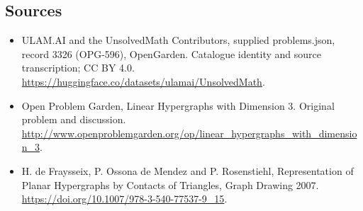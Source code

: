 \documentclass[11pt,a4paper]{article}
\begin{document}
\subsection{Sources}
\begin{itemize}
\item[S1] ULAM.AI and the UnsolvedMath Contributors, supplied problems.json, record 3326 (OPG-596), OpenGarden. Catalogue identity and source transcription; CC BY 4.0.
\url{https://huggingface.co/datasets/ulamai/UnsolvedMath}.
\item[S2] Open Problem Garden, Linear Hypergraphs with Dimension 3. Original problem and discussion.
\url{http://www.openproblemgarden.org/op/linear_hypergraphs_with_dimension_3}.
\item[S3] H. de Fraysseix, P. Ossona de Mendez and P. Rosenstiehl, Representation of Planar Hypergraphs by Contacts of Triangles, Graph Drawing 2007.
\url{https://doi.org/10.1007/978-3-540-77537-9_15}.
\end{itemize}
\end{document}

